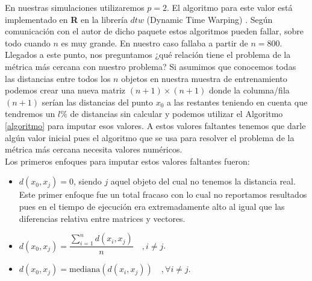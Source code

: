 \documentclass[12pt]{report} %
\theoremstyle{definition}
\begin{document}
{En nuestras simulaciones utilizaremos $p=2$. El algoritmo para este valor está implementado en \textbf{\textsf{R}} en la librería $dtw$ (Dynamic Time Warping) \cite{dtw}. Según comunicación con el autor de dicho paquete estos algoritmos pueden fallar, sobre todo cuando $n$ es muy grande. En nuestro caso fallaba a partir de $n = 800$.\\

Llegados a este punto, nos preguntamos ¿qué relación tiene el problema de la métrica más cercana con nuestro problema? Si asumimos que conocemos todas las distancias entre todos los $n$ objetos en nuestra muestra de entrenamiento podemos crear una nueva matriz $(n+1) \times (n+1)$ donde la columna/fila $(n+1)$ serían las distancias del punto $x_0$ a las restantes teniendo en cuenta que tendremos un $l \%$ de distancias sin calcular y podemos utilizar el Algoritmo \ref{algoritmo} para imputar esos valores. A estos valores faltantes tenemos que darle algún valor inicial pues el algoritmo que se usa para resolver el problema de la métrica más cercana necesita valores numéricos.\\

\noindent Los primeros enfoques para imputar estos valores faltantes fueron:
\begin{itemize}
	\item $d(x_0,x_j) = 0$, siendo $j$ aquel objeto del cual no tenemos la distancia real. Este primer enfoque fue un total fracaso con lo cual no reportamos resultados pues en el tiempo de ejecución era extremadamente alto al igual que las diferencias relativa entre matrices y vectores.
	\item $d(x_0,x_j) = \dfrac{\sum\limits_{i=1}^{n}d(x_i,x_j)}{n}  \quad , i \neq j$.
	\item $d(x_0,x_j) = \text{mediana}(d(x_i,x_j)) \quad , \forall i \neq j$.
\end{itemize}

}
\end{document}

